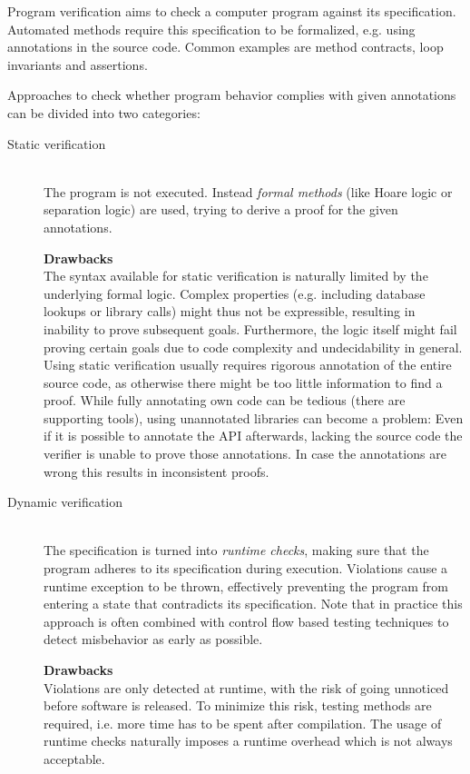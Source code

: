 Program verification aims to check a computer program against its specification.
Automated methods require this specification to be formalized, e.g. using annotations in the source code.
Common examples are method contracts, loop invariants and assertions.

Approaches to check whether program behavior complies with given annotations can be divided into two categories:
\begin{description}
    \item[Static verification]~\\
        The program is not executed. 
        Instead \emph{formal methods} (like Hoare logic or separation logic) are used, trying to derive a proof for the given annotations.
        
        \textbf{Drawbacks}\\
        The syntax available for static verification is naturally limited by the underlying formal logic.
        Complex properties (e.g. including database lookups or library calls) might thus not be expressible, resulting in inability to prove subsequent goals.
        Furthermore, the logic itself might fail proving certain goals due to code complexity and undecidability in general.
        Using static verification usually requires rigorous annotation of the entire source code, as otherwise there might be too little information to find a proof.
        While fully annotating own code can be tedious (there are supporting tools), using unannotated libraries can become a problem:
        Even if it is possible to annotate the API afterwards, lacking the source code the verifier is unable to prove those annotations.
        In case the annotations are wrong this results in inconsistent proofs.
        
    \item[Dynamic verification]~\\
        The specification is turned into \emph{runtime checks}, making sure that the program adheres to its specification during execution.
        Violations cause a runtime exception to be thrown, effectively preventing the program from entering a state that contradicts its specification.
        Note that in practice this approach is often combined with control flow based testing techniques to detect misbehavior as early as possible.
        
        \textbf{Drawbacks}\\
        Violations are only detected at runtime, with the risk of going unnoticed before software is released.
        To minimize this risk, testing methods are required, i.e. more time has to be spent after compilation.
        The usage of runtime checks naturally imposes a runtime overhead which is not always acceptable.
\end{description}

